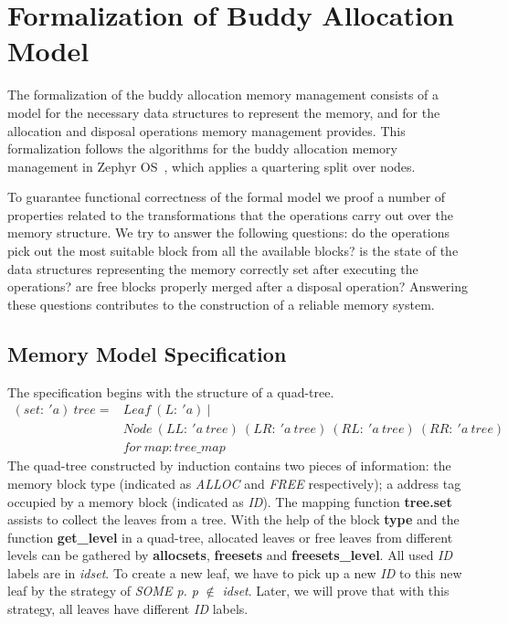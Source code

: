 \section{Formalization of Buddy Allocation Model}
The formalization of the buddy allocation memory management consists of a model for the necessary data structures to represent the memory, and for the allocation and disposal operations memory management provides. This formalization follows the algorithms for the buddy allocation memory management in Zephyr OS~\cite{}, which applies a quartering split over nodes.


To guarantee functional correctness of the formal model we proof a number of properties related to the transformations that the operations carry out over the memory structure. We try to answer the following questions: do the operations pick out the most suitable block from all the available blocks? is the state of the data structures representing the memory correctly set after executing the operations? are free blocks properly merged after a disposal operation? Answering these questions contributes to the construction of a reliable memory system.

\subsection{Memory Model Specification}
The specification begins with the structure of a quad-tree.
\begin{align*}
(set:\ 'a)\ tree = &Leaf\ (L:\ 'a)\ | \\
&Node\ (LL:\ 'a\ tree)\ (LR:\ 'a\ tree)\ (RL:\ 'a\ tree)\ (RR:\ 'a\ tree) \\
&for\ map: tree\_map
\end{align*}
The quad-tree constructed by induction contains two pieces of information: the memory block type (indicated as \emph{ALLOC} and \emph{FREE} respectively); a address tag occupied by a memory block (indicated as \emph{ID}). The mapping function \textbf{tree.set} assists to collect the leaves from a tree. With the help of the block \textbf{type} and the function \textbf{get\_level} in a quad-tree, allocated leaves or free leaves from different levels can be gathered by \textbf{allocsets}, \textbf{freesets} and \textbf{freesets\_level}. All used \emph{ID} labels are in \emph{idset}. To create a new leaf, we have to pick up a new \emph{ID} to this new leaf by the strategy of \emph{SOME p. p} $\notin$ \emph{idset}. Later, we will prove that with this strategy, all leaves have different \emph{ID} labels.

